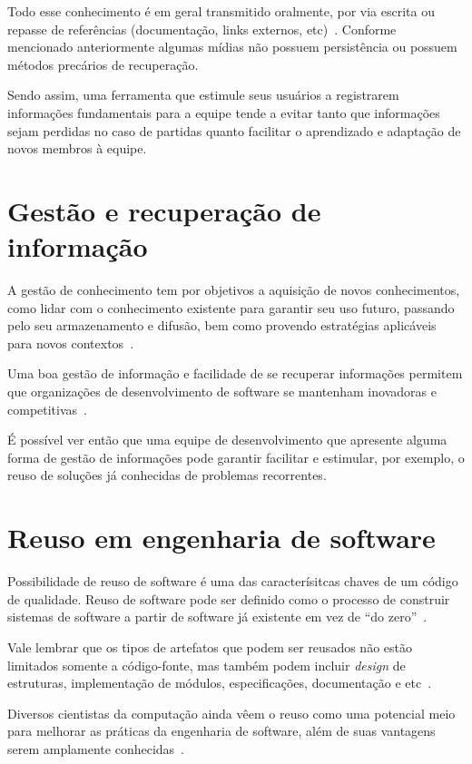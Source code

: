 Todo esse conhecimento é em geral transmitido oralmente, por via escrita ou repasse de referências (documentação, links externos, etc)~\cite{Storey2014, Olson2000, CubraniC2004}. Conforme mencionado anteriormente algumas mídias não possuem persistência ou possuem métodos precários de recuperação.

Sendo assim, uma ferramenta que estimule seus usuários a registrarem informações fundamentais para a equipe tende a evitar tanto que informações sejam perdidas no caso de partidas quanto facilitar o aprendizado e adaptação de novos membros à equipe.

\section{Gestão e recuperação de informação}

A gestão de conhecimento tem por objetivos a aquisição de novos conhecimentos, como lidar com o conhecimento existente para garantir seu uso futuro, passando pelo seu armazenamento e difusão, bem como provendo estratégias aplicáveis para novos contextos~\cite{Bjornson2008}.

Uma boa gestão de informação e facilidade de se recuperar informações permitem que organizações de desenvolvimento de software se mantenham inovadoras e competitivas~\cite{Rabelo2015}.

É possível ver então que uma equipe de desenvolvimento que apresente alguma forma de gestão de informações pode garantir facilitar e estimular, por exemplo, o reuso de soluções já conhecidas de problemas recorrentes.

\section{Reuso em engenharia de software}

Possibilidade de reuso de software é uma das caracterísitcas chaves de um código de qualidade. Reuso de software pode ser definido como o processo de construir sistemas de software a partir de software já existente em vez de ``do zero''~\cite{Krueger1992}.

Vale lembrar que os tipos de artefatos que podem ser reusados não estão limitados somente a código-fonte, mas também podem incluir \textit{design} de estruturas, implementação de módulos, especificações, documentação e etc~\cite{Freeman1993}.

Diversos cientistas da computação ainda vêem o reuso como uma potencial meio para melhorar as práticas da engenharia de software, além de suas vantagens serem amplamente conhecidas~\cite{Krueger1992}.

